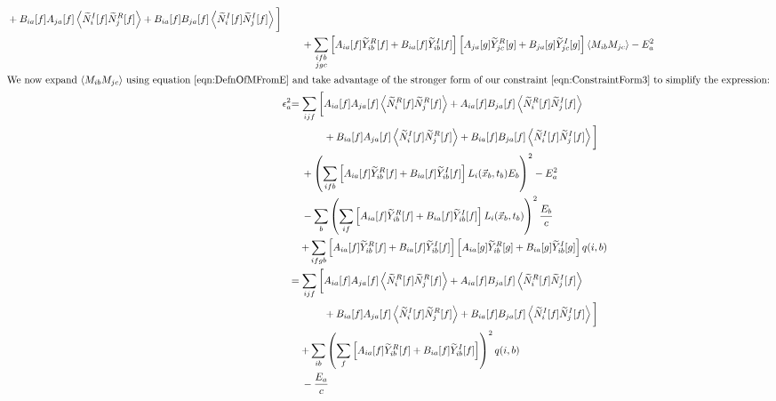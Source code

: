 \begin{align}
\begin{aligned}
  & + B_{ia}[f]A_{ja}[f] \left<\widetilde{N}_i^I[f]\widetilde{N}_j^R[f]\right> + B_{ia}[f]B_{ja}[f] \left<\widetilde{N}_i^I[f]\widetilde{N}_j^I[f]\right>\bigg] \end{aligned} \nonumber \\
&\quad + \sum_{\substack{ifb\\jgc}} \left[A_{ia}[f] \widetilde{Y}_{ib}^R[f] + B_{ia}[f] \widetilde{Y}_{ib}^I[f]\right]\left[A_{ja}[g] \widetilde{Y}_{jc}^R[g] + B_{ja}[g] \widetilde{Y}_{jc}^I[g]\right] \left<M_{ib}M_{jc}\right> - E^2_a \\
%
\intertext{We now expand $\left<M_{ib}M_{jc}\right>$ using equation~\ref{eqn:DefnOfMFromE} and take advantage of the stronger form of our constraint~\ref{eqn:ConstraintForm3} to simplify the expression:}
%
\epsilon^2_a & \begin{aligned}[t]
  = \sum_{ijf} \bigg[ & A_{ia}[f]A_{ja}[f] \left<\widetilde{N}_i^R[f]\widetilde{N}_j^R[f]\right> + A_{ia}[f]B_{ja}[f] \left<\widetilde{N}_i^R[f]\widetilde{N}_j^I[f]\right> \\
  & + B_{ia}[f]A_{ja}[f] \left<\widetilde{N}_i^I[f]\widetilde{N}_j^R[f]\right> + B_{ia}[f]B_{ja}[f] \left<\widetilde{N}_i^I[f]\widetilde{N}_j^I[f]\right>\bigg] \end{aligned} \nonumber \\
&\quad + \left( \sum_{ifb} \left[A_{ia}[f] \widetilde{Y}_{ib}^R[f] + B_{ia}[f] \widetilde{Y}_{ib}^I[f]\right] L_i(\vec{x}_b,t_b) E_b \right)^2 - E^2_a \nonumber \\
&\quad - \sum_b \left( \sum_{if} \left[A_{ia}[f] \widetilde{Y}_{ib}^R[f] + B_{ia}[f] \widetilde{Y}_{ib}^I[f]\right] L_i(\vec{x}_b,t_b) \right)^2 \frac{E_b}{c} \nonumber \\
&\quad \begin{aligned}
  + \sum_{ifgb} &\left[A_{ia}[f] \widetilde{Y}_{ib}^R[f] + B_{ia}[f] \widetilde{Y}_{ib}^I[f]\right]\left[A_{ia}[g] \widetilde{Y}_{ib}^R[g] + B_{ia}[g] \widetilde{Y}_{ib}^I[g]\right] q(i,b) \end{aligned} \\
%
& \begin{aligned}
  = \sum_{ijf} \bigg[ & A_{ia}[f]A_{ja}[f] \left<\widetilde{N}_i^R[f]\widetilde{N}_j^R[f]\right> + A_{ia}[f]B_{ja}[f] \left<\widetilde{N}_i^R[f]\widetilde{N}_j^I[f]\right> \\
  & + B_{ia}[f]A_{ja}[f] \left<\widetilde{N}_i^I[f]\widetilde{N}_j^R[f]\right> + B_{ia}[f]B_{ja}[f] \left<\widetilde{N}_i^I[f]\widetilde{N}_j^I[f]\right>\bigg] \end{aligned} \nonumber \\
&\quad \begin{aligned}
  + \sum_{ib} &\left( \sum_f \left[A_{ia}[f] \widetilde{Y}_{ib}^R[f] + B_{ia}[f] \widetilde{Y}_{ib}^I[f]\right]\right)^2 q(i,b) \end{aligned} \nonumber \\
&\quad - \frac{E_a}{c}
\end{align}

